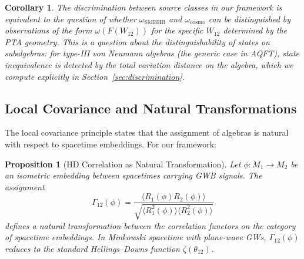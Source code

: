 \documentclass[11pt,a4paper]{article}
\newtheorem{proposition}{Proposition}[section]
\newtheorem{corollary}{Corollary}[section]
\begin{document}
\begin{corollary}
The discrimination between source classes in our framework is equivalent to the question of whether $\omega_{\text{SMBHB}}$ and $\omega_{\text{cosmo}}$ can be distinguished by observations of the form $\omega(F(W_{12}))$ for the specific $W_{12}$ determined by the PTA geometry. This is a question about the distinguishability of states on subalgebras: for type-III von Neumann algebras (the generic case in AQFT), state inequivalence is detected by the total variation distance on the algebra, which we compute explicitly in Section~\ref{sec:discrimination}.
\end{corollary}

\subsection{Local Covariance and Natural Transformations}\label{sec:natural}

The local covariance principle states that the assignment of algebras is natural with respect to spacetime embeddings. For our framework:

\begin{proposition}[HD Correlation as Natural Transformation]\label{prop:hd-natural}
Let $\phi: M_1 \to M_2$ be an isometric embedding between spacetimes carrying GWB signals. The assignment
\begin{equation}
\Gamma_{12}(\phi) = \frac{\langle R_1(\phi) R_2(\phi) \rangle}{\sqrt{\langle R_1^2(\phi) \rangle \langle R_2^2(\phi) \rangle}}
\end{equation}
defines a natural transformation between the correlation functors on the category of spacetime embeddings. In Minkowski spacetime with plane-wave GWs, $\Gamma_{12}(\phi)$ reduces to the standard Hellings--Downs function $\zeta(\theta_{12})$.
\end{proposition}
\end{document}
